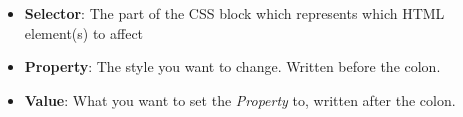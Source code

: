 \begin{itemize}[leftmargin=*]
    \item
        \textbf{Selector}:
        The part of the CSS block which represents which HTML element(s) to affect
    \item
        \textbf{Property}:
        The style you want to change. Written before the colon.
    \item
        \textbf{Value}:
        What you want to set the \textit{Property} to, written after the colon.
\end{itemize}

